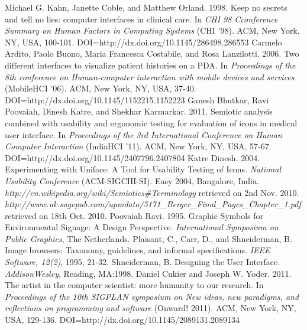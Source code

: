 \clearpage

\begin{thebibliography}{}
\bibitem{} Michael G. Kahn, Janette Coble, and Matthew Orland. 1998. Keep no secrets and tell no lies: computer interfaces in clinical care. In \emph{CHI 98 Cconference Summary on Human Factors in Computing Systems} (CHI '98). ACM, New York, NY, USA, 100-101. DOI=http://dx.doi.org/10.1145/286498.286553
\bibitem{} Carmelo Ardito, Paolo Buono, Maria Francesca Costabile, and Rosa Lanzilotti. 2006. Two different interfaces to visualize patient histories on a PDA. In \emph{Proceedings of the 8th conference on Human-computer interaction with mobile devices and services} (MobileHCI '06). ACM, New York, NY, USA, 37-40. DOI=http://dx.doi.org/10.1145/1152215.1152223
\bibitem{} Ganesh Bhutkar, Ravi Poovaiah, Dinesh Katre, and Shekhar Karmarkar. 2011. Semiotic analysis combined with usability and ergonomic testing for evaluation of icons in medical user interface. In \emph{Proceedings of the 3rd International Conference on Human Computer Interaction} (IndiaHCI '11). ACM, New York, NY, USA, 57-67. DOI=http://dx.doi.org/10.1145/2407796.2407804
\bibitem{} Katre Dinesh. 2004. Experimenting with Uniface: A Tool for
Usability Testing of Icons. \emph{National Usability Conference} (ACM-SIGCHI-SI). Easy 2004, Bangalore, India.
\bibitem{} \emph{http://en.wikipedia.org/wiki/Semiotics\#Terminology} retrieved
on 2nd Nov. 2010.
\bibitem{} \emph{http://www.uk.sagepub.com/upmdata/5171\_Berger\_Final\_Pages\_Chapter\_1.pdf} retrieved on 18th Oct. 2010.
\bibitem{} Poovaiah Ravi. 1995. Graphic Symbols for Environmental
Signage: A Design Perspective. \emph{International Symposium on
Public Graphics}, The Netherlands.
\bibitem{} Plaisant, C., Carr, D., and Shneiderman, B. Image browsers:
Taxonomy, guidelines, and informal specifications. \emph{IEEE
Software, 12(2)}, 1995, 21-32.
\bibitem{} Shneiderman, B. Designing the User Interface. \emph{AddisonWesley},
Reading, MA:1998.
\bibitem{} Daniel Cukier and Joseph W. Yoder. 2011. The artist in the computer scientist: more humanity to our research. In \emph{Proceedings of the 10th SIGPLAN symposium on New ideas, new paradigms, and reflections on programming and software} (Onward! 2011). ACM, New York, NY, USA, 129-136. DOI=http://dx.doi.org/10.1145/2089131.2089134
\end{thebibliography}

